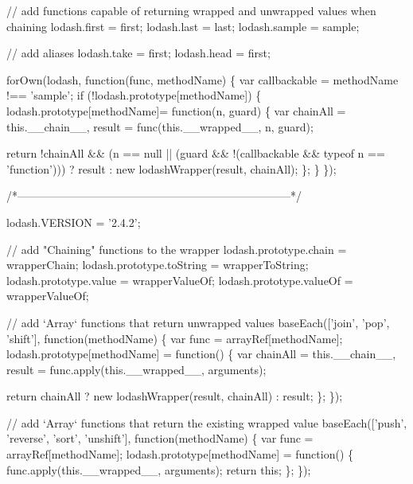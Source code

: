 \begin{DoxyCodeInclude}
    \textcolor{comment}{// add functions capable of returning wrapped and unwrapped values when chaining}
    lodash.first = first;
    lodash.last = last;
    lodash.sample = sample;

    \textcolor{comment}{// add aliases}
    lodash.take = first;
    lodash.head = first;

    forOwn(lodash, \textcolor{keyword}{function}(func, methodName) \{
      var callbackable = methodName !== \textcolor{stringliteral}{'sample'};
      \textcolor{keywordflow}{if} (!lodash.prototype[methodName]) \{
        lodash.prototype[methodName]= function(n, guard) \{
          var chainAll = this.\_\_chain\_\_,
              result = func(this.\_\_wrapped\_\_, n, guard);

          return !chainAll && (n == null || (guard && !(callbackable && typeof n == \textcolor{stringliteral}{'function'})))
            ? result
            : new lodashWrapper(result, chainAll);
        \};
      \}
    \});

    \textcolor{comment}{/*--------------------------------------------------------------------------*/}

    lodash.VERSION = \textcolor{stringliteral}{'2.4.2'};

    \textcolor{comment}{// add "Chaining" functions to the wrapper}
    lodash.prototype.chain = wrapperChain;
    lodash.prototype.toString = wrapperToString;
    lodash.prototype.value = wrapperValueOf;
    lodash.prototype.valueOf = wrapperValueOf;

    \textcolor{comment}{// add `Array` functions that return unwrapped values}
    baseEach([\textcolor{stringliteral}{'join'}, \textcolor{stringliteral}{'pop'}, \textcolor{stringliteral}{'shift'}], \textcolor{keyword}{function}(methodName) \{
      var func = arrayRef[methodName];
      lodash.prototype[methodName] = \textcolor{keyword}{function}() \{
        var chainAll = this.\_\_chain\_\_,
            result = func.apply(this.\_\_wrapped\_\_, arguments);

        \textcolor{keywordflow}{return} chainAll
          ? \textcolor{keyword}{new} lodashWrapper(result, chainAll)
          : result;
      \};
    \});

    \textcolor{comment}{// add `Array` functions that return the existing wrapped value}
    baseEach([\textcolor{stringliteral}{'push'}, \textcolor{stringliteral}{'reverse'}, \textcolor{stringliteral}{'sort'}, \textcolor{stringliteral}{'unshift'}], \textcolor{keyword}{function}(methodName) \{
      var func = arrayRef[methodName];
      lodash.prototype[methodName] = \textcolor{keyword}{function}() \{
        func.apply(this.\_\_wrapped\_\_, arguments);
        \textcolor{keywordflow}{return} \textcolor{keyword}{this};
      \};
    \});


\end{DoxyCodeInclude}
